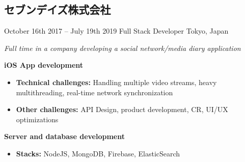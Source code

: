 \documentclass[]{template/friggeri-cv} %
\begin{document}
\subsection{セブンデイズ株式会社}
\begin{entrylist}


\entry
{October 16th 2017 -- July 19th 2019}
{Full Stack Developer}
{Tokyo, Japan}
{\emph{Full time in a company developing a social network/media diary application}

\textbf{iOS App development} 
\begin{itemize}
\item \textbf{Technical challenges:} Handling multiple video streams, heavy multithreading, real-time network synchronization
\item \textbf{Other challenges:} API Design, product development, CR, UI/UX optimizations
\end{itemize}
\textbf{Server and database development} 
\begin{itemize}
\item \textbf{Stacks:} NodeJS, MongoDB, Firebase, ElasticSearch

\end{itemize}


}
\end{entrylist}
\end{document}
